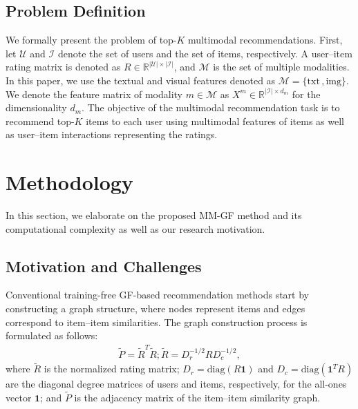 \documentclass[a4paper,fleqn]{cas-sc}
\renewcommand{\cite}{\citep}
\begin{document}
\subsection{Problem Definition} We formally present the problem of top-$K$ multimodal recommendations. First, let $\mathcal U $ and $\mathcal I$ denote the set of users and the set of items, respectively. A user--item rating matrix is denoted as $R \in \mathbb{R}^{|\mathcal U | \times |\mathcal I |}$, and $\mathcal M$ is the set of multiple modalities. In this paper, we use the textual and visual features denoted as $\mathcal M = \{\text{txt} \, , \text{img}\}$. We denote the feature matrix of modality $m \in \mathcal{M}$ as $X^m \in \mathbb R ^{|\mathcal I | \times d_m}$ for the dimensionality $d_m$. The objective of the multimodal recommendation task is to recommend top-$K$ items to each user using multimodal features of items as well as user--item interactions representing the ratings.


\section{Methodology}
\label{section 4}

In this section, we elaborate on the proposed \textsf{MM-GF} method and its computational complexity as well as our research motivation.

\subsection{Motivation and Challenges}
\label{4.1.Motivation}
Conventional training-free GF-based recommendation methods \cite{DBLP:conf/cikm/ShenWZSZLL21,DBLP:conf/www/LiuLGL0SG23} start by constructing a graph structure, where nodes represent items and edges correspond to item--item similarities. The graph construction process is formulated as follows:
\begin{equation}
\label{conventional_graph}
\begin{aligned}
    \tilde{P} = \tilde{R}^T\tilde{R} ; \tilde{R} = D^{-1/2}_rRD^{-1/2}_c,
\end{aligned}
\end{equation}
where $\tilde{R}$ is the normalized rating matrix; $D_r=\text{diag}(R\mathbf{1})$ and $D_c = \text{diag} (\mathbf{1}^TR)$ are the diagonal degree matrices of users and items, respectively, for the all-ones vector ${\mathbf 1}$; and $\tilde{P}$ is the adjacency matrix of the item--item similarity graph. 
\end{document}
